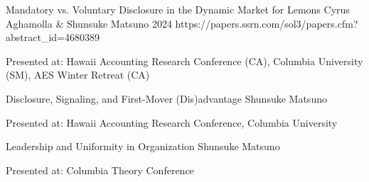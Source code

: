 


\paperentry
	{Mandatory vs. Voluntary Disclosure in the Dynamic Market for Lemons}   %
	{Cyrus Aghamolla \& Shunsuke Matsuno}   %
	{2024}   %
	{https://papers.ssrn.com/sol3/papers.cfm?abstract_id=4680389}  %
	{}   %
	{}   %
	{
	\begin{cvitems} %
		\item {Presented at: Hawaii Accounting Research Conference (CA), Columbia University (SM), AES Winter Retreat (CA)}
	\end{cvitems}
	}
\vspace{.3cm}


\paperentry
	{Disclosure, Signaling, and First-Mover (Dis)advantage}
	{Shunsuke Matsuno}
	{}
	{}
	{}
	{}
	{
	\begin{cvitems} %
		\item {Presented at: Hawaii Accounting Research Conference, Columbia University}
	\end{cvitems}
	}

\paperentry
	{Leadership and Uniformity in Organization}
	{Shunsuke Matsuno}
	{}
	{}
	{}
	{}
	{
	\begin{cvitems} %
		\item {Presented at: Columbia Theory Conference}
	\end{cvitems}
	}




	
